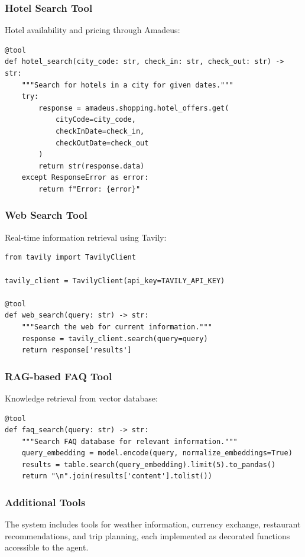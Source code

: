 \documentclass[12pt,a4paper]{article}
\begin{document}
\subsubsection{Hotel Search Tool}
Hotel availability and pricing through Amadeus:

\begin{lstlisting}
@tool
def hotel_search(city_code: str, check_in: str, check_out: str) -> str:
    """Search for hotels in a city for given dates."""
    try:
        response = amadeus.shopping.hotel_offers.get(
            cityCode=city_code,
            checkInDate=check_in,
            checkOutDate=check_out
        )
        return str(response.data)
    except ResponseError as error:
        return f"Error: {error}"
\end{lstlisting}

\subsubsection{Web Search Tool}
Real-time information retrieval using Tavily:

\begin{lstlisting}
from tavily import TavilyClient

tavily_client = TavilyClient(api_key=TAVILY_API_KEY)

@tool
def web_search(query: str) -> str:
    """Search the web for current information."""
    response = tavily_client.search(query=query)
    return response['results']
\end{lstlisting}

\subsubsection{RAG-based FAQ Tool}
Knowledge retrieval from vector database:

\begin{lstlisting}
@tool
def faq_search(query: str) -> str:
    """Search FAQ database for relevant information."""
    query_embedding = model.encode(query, normalize_embeddings=True)
    results = table.search(query_embedding).limit(5).to_pandas()
    return "\n".join(results['content'].tolist())
\end{lstlisting}

\subsubsection{Additional Tools}
The system includes tools for weather information, currency exchange, restaurant recommendations, and trip planning, each implemented as decorated functions accessible to the agent.
\end{document}
